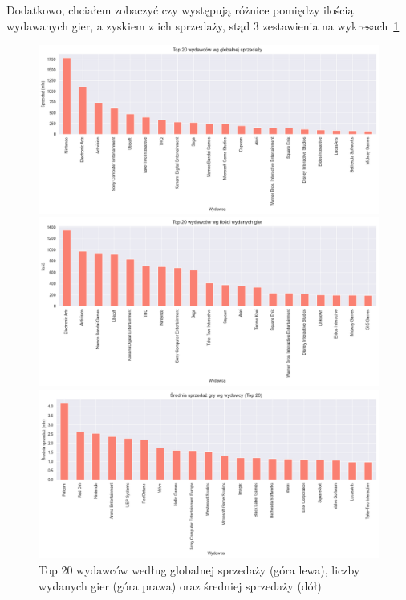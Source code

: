 \documentclass[11pt]{article}
\begin{document}
Dodatkowo, chciałem zobaczyć czy występują różnice pomiędzy ilością wydawanych gier, a zyskiem z ich sprzedaży, stąd 3 zestawienia na wykresach~\ref{fig:wydawcy_all}
\begin{figure}[H]
    \centering
    \begin{minipage}[t]{0.48\linewidth}
        \centering
        \includegraphics[width=\linewidth]{figures/wydawcy-sprzedaz}
    \end{minipage}
    \hfill
    \begin{minipage}[t]{0.48\linewidth}
        \centering
        \includegraphics[width=\linewidth]{figures/wydawcy-ilosc}
    \end{minipage}

    \vspace{0.5em}

    \begin{minipage}[t]{0.6\linewidth}
        \centering
        \includegraphics[width=\linewidth]{figures/wydawcy-srednia-sprzedaz}
    \end{minipage}

    \caption{Top 20 wydawców według globalnej sprzedaży (góra lewa), liczby wydanych gier (góra prawa) oraz średniej sprzedaży (dół)}
    \label{fig:wydawcy_all}
\end{figure}
\end{document}
